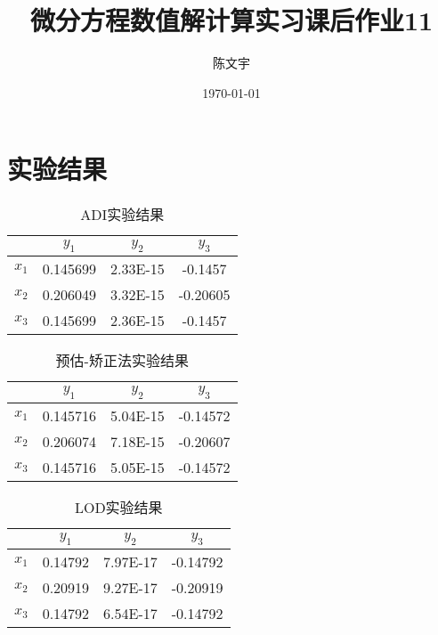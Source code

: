 \documentclass{article}
\title{微分方程数值解计算实习课后作业11}
\author{陈文宇}
\date{\today}
\begin{document}
\maketitle

\tableofcontents

\newpage
\section{实验结果}

\begin{table}[htbp]
  \centering
  
    \begin{tabular}{cccc}
    \midrule
          & $y_{1}$    & $y_{2}$     & $y_{3}$  \\
    \toprule
    $x_{1}$    & 0.145699 & 2.33E-15 & -0.1457 \\
    $x_{2}$    & 0.206049 & 3.32E-15 & -0.20605 \\
    $x_{3}$    & 0.145699 & 2.36E-15 & -0.1457 \\
    \toprule
    \end{tabular}%
  \label{tab:addlabel}%
  \caption{ADI实验结果}
\end{table}%

\begin{table}[htbp]
  \centering
    \begin{tabular}{cccc}
    \midrule
          & $y_{1}$    & $y_{2}$     & $y_{3}$  \\
    \toprule
    $x_{1}$    & 0.145716 & 5.04E-15 & -0.14572 \\
    $x_{2}$    & 0.206074 & 7.18E-15 & -0.20607 \\
    $x_{3}$    & 0.145716 & 5.05E-15 & -0.14572 \\
    \toprule
    \end{tabular}%
  \label{tab:addlabel}%
  \caption{预估-矫正法实验结果}
\end{table}%

\begin{table}[htbp]
  \centering
    \begin{tabular}{cccc}
    \midrule
          & $y_{1}$    & $y_{2}$     & $y_{3}$  \\
    \midrule
    $x_{1}$     & 0.14792 & 7.97E-17 & -0.14792 \\
    $x_{2}$     & 0.20919 & 9.27E-17 & -0.20919 \\
    $x_{3}$     & 0.14792 & 6.54E-17 & -0.14792 \\
    \bottomrule
    \end{tabular}%
  \label{tab:addlabel}%
  \caption{LOD实验结果}
\end{table}%
\end{document}
